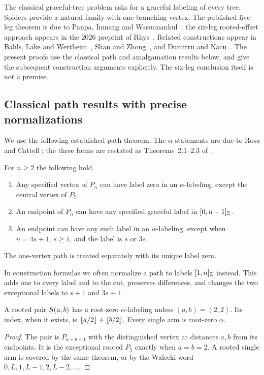 The classical graceful-tree problem asks for a graceful labeling of every tree. Spiders provide a natural family with one branching vertex. The published five-leg theorem is due to Panpa, Imnang and Wasuanankul~\cite{Panpa2025}; the six-leg rooted-offset approach appears in the 2026 preprint of Rhys~\cite{Rhys2026}. Related constructions appear in Bahls, Lake and Wertheim~\cite{BahlsLakeWertheim2010}, Shan and Zhong~\cite{ShanZhong2026}, and Dumitru and Nacu~\cite{DumitruNacu2026}. The present proofs use the classical path and amalgamation results below, and give the subsequent construction arguments explicitly. The six-leg conclusion itself is not a premise.\par\medskip

\subsection{Classical path results with precise normalizations}

We use the following established path theorem. The $\alpha$-statements
are due to Rosa and Cattell \cite{Rosa1977,Cattell2007}; the three
forms are restated as Theorems~2.1--2.3 of \cite{Panpa2025}.

\begin{theorem}\label{common:path-classical}
For $n\ge2$ the following hold.
\begin{enumerate}
\item Any specified vertex of $P_n$ can have label zero in an
$\alpha$-labeling, except the central vertex of $P_5$.
\item An endpoint of $P_n$ can have any specified graceful label in
$[0,n-1]_{\mathbb Z}$.
\item An endpoint can have any such label in an $\alpha$-labeling,
except when $n=4s+1$, $s\ge1$, and the label is $s$ or $3s$.
\end{enumerate}
The one-vertex path is treated separately with its unique label zero.
\end{theorem}

In construction formulas we often normalize a path to labels
$[1,n]_{\mathbb Z}$ instead. This adds one to every label and to the
cut, preserves differences, and changes the two exceptional labels
to $s+1$ and $3s+1$.

\begin{corollary}\label{common:alpha-pair}
A rooted pair $S\!\left(a,b\right)$ has a root-zero $\alpha$-labeling unless
$(a,b)=(2,2)$. Its index, when it exists, is
$\left\lfloor a/2\right\rfloor+\left\lfloor b/2\right\rfloor$. Every single arm is root-zero $\alpha$.
\end{corollary}
\begin{proof}
The pair is $P_{a+b+1}$ with the distinguished vertex at distances
$a,b$ from its endpoints. It is the exceptional rooted $P_5$ exactly
when $a=b=2$. A rooted single arm is covered by the same theorem, or
by the Walecki word $0,L,1,L-1,2,L-2,\ldots$.
\end{proof}


